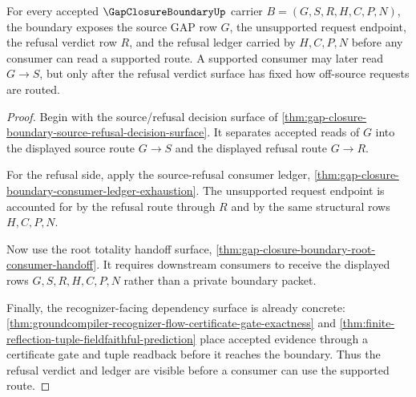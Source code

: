 \begin{theorem}
\label{thm:gap-closure-boundary-refusal-verdict-totality}
For every accepted $\GapClosureBoundaryUp$ carrier $B=(G,S,R,H,C,P,N)$, the boundary exposes the source GAP row $G$, the unsupported request endpoint, the refusal verdict row $R$, and the refusal ledger carried by $H,C,P,N$ before any consumer can read a supported route. A supported consumer may later read $G \longrightarrow S$, but only after the refusal verdict surface has fixed how off-source requests are routed.
\end{theorem}
\begin{proof}
Begin with the source/refusal decision surface of \autoref{thm:gap-closure-boundary-source-refusal-decision-surface}. It separates accepted reads of $G$ into the displayed source route $G \longrightarrow S$ and the displayed refusal route $G \longrightarrow R$.

For the refusal side, apply the source-refusal consumer ledger, \autoref{thm:gap-closure-boundary-consumer-ledger-exhaustion}. The unsupported request endpoint is accounted for by the refusal route through $R$ and by the same structural rows $H,C,P,N$.

Now use the root totality handoff surface, \autoref{thm:gap-closure-boundary-root-consumer-handoff}. It requires downstream consumers to receive the displayed rows $G,S,R,H,C,P,N$ rather than a private boundary packet.

Finally, the recognizer-facing dependency surface is already concrete: \autoref{thm:groundcompiler-recognizer-flow-certificate-gate-exactness} and \autoref{thm:finite-reflection-tuple-fieldfaithful-prediction} place accepted evidence through a certificate gate and tuple readback before it reaches the boundary. Thus the refusal verdict and ledger are visible before a consumer can use the supported route.
\end{proof}

